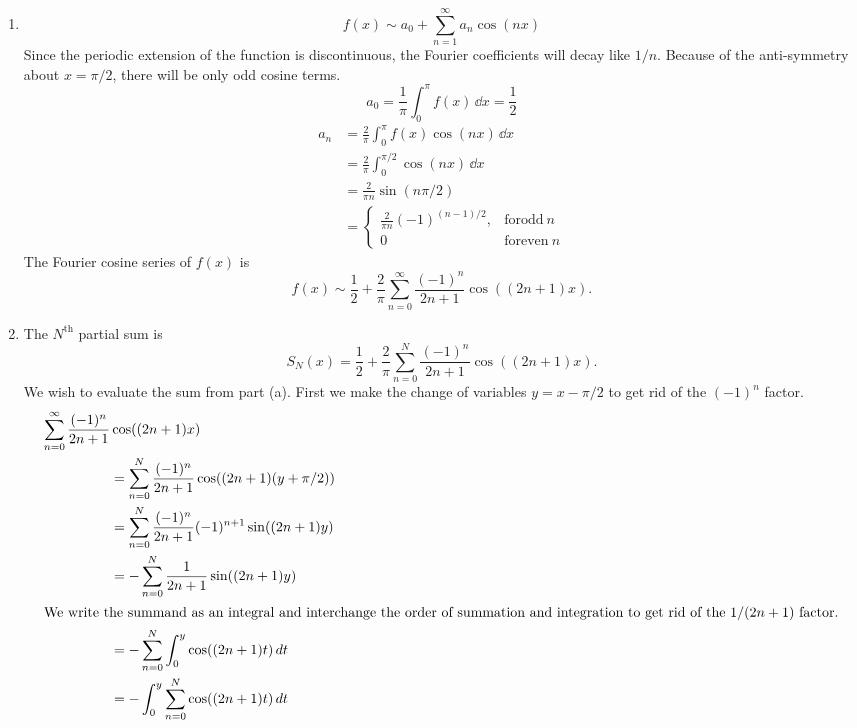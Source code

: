 {%
\begin{Solution}
  \begin{enumerate}
  \item
    \[
    f(x) \sim a_0 + \sum_{n = 1}^\infty a_n \cos(n x)
    \]
    Since the periodic extension of the function is discontinuous, the Fourier
    coefficients will decay like $1/n$.  Because of the anti-symmetry about
    $x = \pi / 2$, there will be only odd cosine terms.
    \[
    a_0 = \frac{1}{\pi} \int_0^\pi f(x) \,\dd x = \frac{1}{2}
    \]
    \begin{align*}
      a_n     &= \frac{2}{\pi} \int_0^\pi f(x) \cos(n x) \,\dd x \\
      &= \frac{2}{\pi} \int_0^{\pi/2} \cos(n x) \,\dd x \\
      &= \frac{2}{\pi n} \sin(n \pi / 2) \\
      &= \begin{cases}
        \frac{2}{\pi n} (-1)^{(n-1)/2}, &\mathrm{for odd}\ n \\
        0 &\mathrm{for even}\ n
      \end{cases}
    \end{align*}
    The Fourier cosine series of $f(x)$ is
    \[
    \boxed{
      f(x) \sim \frac{1}{2} + \frac{2}{\pi} \sum_{n = 0}^\infty \frac{ (-1)^n }{ 2n+1 }
      \cos((2n+1)x).
      }
    \]
  \item
    The $N^{\mathrm{th}}$ partial sum is
    \[
    S_N(x) = \frac{1}{2} + \frac{2}{\pi} \sum_{n=0}^N \frac{ (-1)^n }{ 2n+1 }
    \cos((2n+1)x).
    \]
    We wish to evaluate the sum from part (a).  First we make the change of
    variables $y = x - \pi / 2$ to get rid of the $(-1)^n$ factor.
    \begin{align*}
      \sum_{n = 0}^\infty \frac{ (-1)^n }{ 2n+1 } &\cos((2n+1)x) \\
      &= \sum_{n=0}^N \frac{ (-1)^n }{ 2n+1 } \cos((2n+1)(y+\pi/2)) \\
      &= \sum_{n=0}^N \frac{ (-1)^n }{ 2n+1 } (-1)^{n+1} \sin((2n+1)y) \\
      &= - \sum_{n=0}^N \frac{ 1 }{ 2n+1 } \sin((2n+1)y) \\
      \intertext{We write the summand as an integral and interchange the order 
        of summation and integration to get rid of the $1/(2n+1)$ factor.}
      &= - \sum_{n=0}^N \int_0^y \cos((2n+1)t) \,d t \\
      &= - \int_0^y \sum_{n=0}^N \cos((2n+1)t) \,d t \\

\end{align*}
\end{enumerate}
\end{Solution}}
